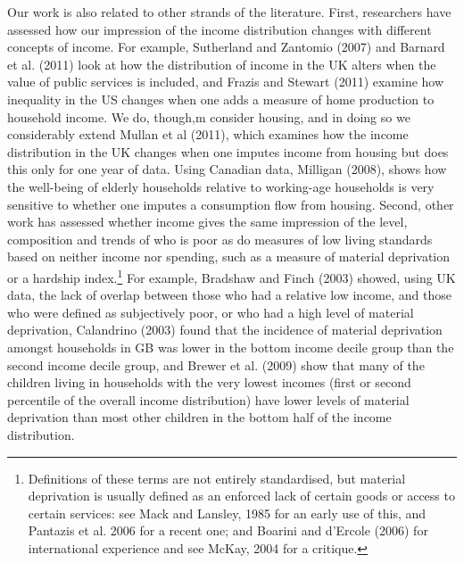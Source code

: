 Our work is also related to other strands of the literature. First, researchers have assessed how our impression of the income distribution changes with different concepts of income. For example, Sutherland and Zantomio (2007) and Barnard et al. (2011) look at how the distribution of income in the UK alters when the value of public services is included, and Frazis and Stewart (2011) examine how inequality in the US changes when one adds a measure of home production to household income. We do, though,m consider housing, and in doing so we considerably extend Mullan et al (2011), which examines how the income distribution in the UK changes when one imputes income from housing but does this only for one year of data. Using Canadian data, Milligan (2008), shows how the well-being of elderly households relative to working-age households is very sensitive to whether one imputes a consumption flow from housing. Second, other work has assessed whether income gives the same impression of the level, composition and trends of who is poor as do measures of low living standards based on neither income nor spending, such as a measure of material deprivation or a hardship index.\footnote{ Definitions of these terms are not entirely standardised, but material deprivation is usually defined as an enforced lack of certain goods or access to certain services: see Mack and Lansley, 1985 for an early use of this, and Pantazis et al. 2006 for a recent one; and Boarini and d'Ercole (2006) for international experience and see McKay, 2004 for a critique.} For example, Bradshaw and Finch (2003) showed, using UK data, the lack of overlap between those who had a relative low income, and those who were defined as subjectively poor, or who had a high level of material deprivation, Calandrino (2003) found that the incidence of material deprivation amongst households in GB was lower in the bottom income decile group than the second income decile group, and Brewer et al. (2009) show that many of the children living in households with the very lowest incomes (first or second percentile of the overall income distribution) have lower levels of material deprivation than most other children in the bottom half of the income distribution.


